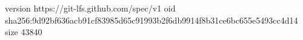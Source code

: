 version https://git-lfs.github.com/spec/v1
oid sha256:9d92bf636acb91cf83985d65c91993b2f6db9914f8b31ce6bc655e5493cc4d14
size 43840
